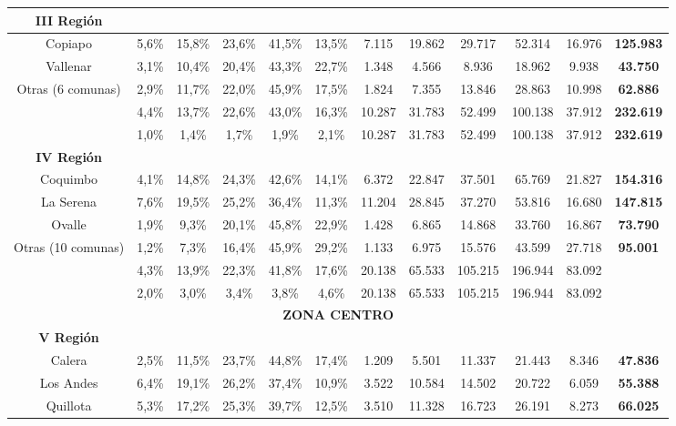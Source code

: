 \begin{table}[htpb!]
{\begin{tabular}{|c|c c c c c| c c c c c | c|}
	\hline
	\multicolumn{1}{|c|}{\textbf{III Región}}\\
	\hline
	Copiapo & 5,6\% & 15,8\% & 23,6\% & 41,5\% & 13,5\% & 7.115 & 19.862 & 29.717 & 52.314 & 16.976 & \textbf{125.983} \\
	Vallenar & 3,1\% & 10,4\% & 20,4\% & 43,3\% & 22,7\% & 1.348 & 4.566 & 8.936 & 18.962 & 9.938 & \textbf{43.750} \\
	Otras (6 comunas) & 2,9\% & 11,7\% & 22,0\% & 45,9\% & 17,5\% & 1.824 & 7.355 & 13.846 & 28.863 & 10.998 & \textbf{62.886} \\
	\hline
	\blue{Total Región} & 4,4\% & 13,7\% & 22,6\% & 43,0\% & 16,3\% & 10.287 & 31.783 & 52.499 & 100.138 & 37.912 & \textbf{232.619} \\
	\hline
	\green{Total Región/País} &1,0\% &1,4\% &1,7\% &1,9\%	& 2,1\% & 10.287 & 31.783 & 52.499 & 100.138 & 37.912 & \textbf{232.619} \\
	\hline
	\multicolumn{1}{|c|}{\textbf{IV Región}}\\
	\hline
	Coquimbo & 4,1\% & 14,8\% & 24,3\% & 42,6\% & 14,1\% & 6.372 & 22.847 & 37.501 & 65.769 & 21.827 & \textbf{154.316} \\
	La Serena & 7,6\% & 19,5\% & 25,2\% & 36,4\% & 11,3\% & 11.204 & 28.845 & 37.270 & 53.816 & 16.680 & \textbf{147.815} \\
	Ovalle & 1,9\% & 9,3\% & 20,1\% & 45,8\% & 22,9\% & 1.428 & 6.865 & 14.868 & 33.760 & 16.867 & \textbf{73.790} \\
	Otras (10 comunas) & 1,2\% & 7,3\% & 16,4\% & 45,9\% & 29,2\% & 1.133 & 6.975 & 15.576 & 43.599 & 27.718 & \textbf{95.001} \\
	\hline
	\blue{Total Región} & 4,3\% & 13,9\% & 22,3\% & 41,8\% & 17,6\% & 20.138 & 65.533 & 105.215 & 196.944 & 83.092 & \textbf{\blue{470.922}} \\
	\hline
	\green{Total Región/País}& 2,0\% & 3,0\% &3,4\% &3,8\% &4,6\%  & 20.138 & 65.533 & 105.215 & 196.944 & 83.092 & \textbf{\blue{470.922}} \\
	\hline
	\multicolumn{12}{|c|}{\textbf{ZONA CENTRO}}\\
	\hline
	\multicolumn{1}{|c|}{\textbf{V Región}}\\
	\hline
	Calera & 2,5\% & 11,5\% & 23,7\% & 44,8\% & 17,4\% & 1.209 & 5.501 & 11.337 & 21.443 & 8.346 & \textbf{47.836} \\
	Los Andes & 6,4\% & 19,1\% & 26,2\% & 37,4\% & 10,9\% & 3.522 & 10.584 & 14.502 & 20.722 & 6.059 & \textbf{55.388} \\
	Quillota & 5,3\% & 17,2\% & 25,3\% & 39,7\% & 12,5\% & 3.510 & 11.328 & 16.723 & 26.191 & 8.273 & \textbf{66.025} \\

\end{tabular}}
\end{table}
